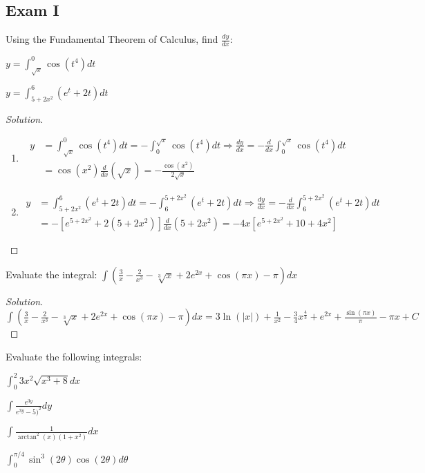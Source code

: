 \documentclass[crop=false,class=book]{standalone}
\begin{document}
\subsection{Exam I}
\begin{problem}
Using the Fundamental Theorem of Calculus, find $\frac{dy}{dx}$:
\begin{enumerate}
    \begin{multicols}{2}
        \item $y=\int_{\sqrt{x}}^{0}\cos(t^{4})dt$
        \item $y=\int_{5+2x^{2}}^{6}(e^{t}+2t)dt$
    \end{multicols}
\end{enumerate}
\end{problem}
\begin{proof}[Solution]
\
\begin{enumerate}
    \item   \begin{align*}
        y&=\int_{\sqrt{x}}^{0}\cos(t^{4})dt=-\int_{0}^{\sqrt{x}}\cos(t^{4})dt\Rightarrow     \frac{dy}{dx}=-\frac{d}{dx}\int_{0}^{\sqrt{x}}\cos(t^{4})dt\\
        &=\cos(x^{2})\frac{d}{dx}(\sqrt{x})=-\frac{\cos(x^{2})}{2\sqrt{x}}
            \end{align*}
    \item   \begin{align*}
        y&=\int_{5+2x^{2}}^{6}(e^{t}+2t)dt=-\int_{6}^{5+2x^{2}}(e^{t}+2t)dt\Rightarrow \frac{dy}{dx}=-\frac{d}{dx}\int_{6}^{5+2x^{2}}(e^{t}+2t)dt\\
        &=-[e^{5+2x^{2}}+2(5+2x^{2})]\frac{d}{dx}(5+2x^{2})=-4x[e^{5+2x^{2}}+10+4x^{2}]
            \end{align*}
\end{enumerate}
\end{proof}
\begin{problem}
Evaluate the integral: $\int(\frac{3}{x}-\frac{2}{x^{3}}-\sqrt[3]{x}+2e^{2x}+\cos(\pi x)-\pi)dx$
\end{problem}
\begin{proof}[Solution]
$\int(\frac{3}{x}-\frac{2}{x^{3}}-\sqrt[3]{x}+2e^{2x}+\cos(\pi x)-\pi)dx=3\ln(|x|)+\frac{1}{x^{2}}-\frac{3}{4}x^{\frac{4}{3}}+e^{2x}+\frac{\sin(\pi x)}{\pi}-\pi x+C$
\end{proof}
\begin{problem}
Evaluate the following integrals:
\begin{enumerate}
\end{enumerate}
\end{problem}
\end{document}

